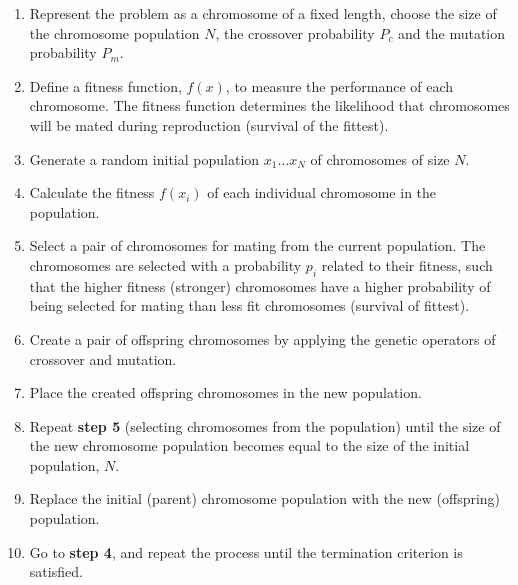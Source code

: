 \documentclass{article}
\newcommand{\bold}[1]{\textbf{#1}}
\begin{document}
\begin{enumerate}

\item Represent the problem as a chromosome of a fixed length, choose the size of the chromosome population $N$, the crossover probability $P_c$ and the mutation probability $P_m$.

\item Define a fitness function, $f(x)$, to measure the performance of each chromosome. The fitness function determines the likelihood that chromosomes will be mated during reproduction (survival of the fittest).

\item Generate a random initial population $x_1 \ldots x_N$ of chromosomes of size $N$.

\item Calculate the fitness $f(x_i)$ of each individual chromosome in the population.

\item Select a pair of chromosomes for mating from the current population. The chromosomes are selected with a probability $p_i$ related to their fitness, such that the higher fitness (stronger) chromosomes have a higher probability of being selected for mating than less fit chromosomes (survival of fittest).

\item Create a pair of offspring chromosomes by applying the genetic operators of crossover and mutation.

\item Place the created offspring chromosomes in the new population.

\item Repeat \bold{step 5} (selecting chromosomes from the population) until the size of the new chromosome population becomes equal to the size of the initial population, $N$.

\item Replace the initial (parent) chromosome population with the new (offspring) population.

\item Go to \bold{step 4}, and repeat the process until the termination criterion is satisfied.

\end{enumerate}
\end{document}
